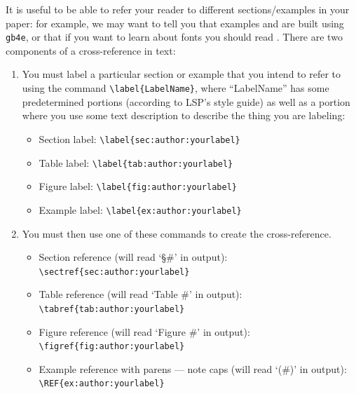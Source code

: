\documentclass[output=paper,colorlinks,citecolor=brown,
]{langscibook}
\begin{document}
It is useful to be able to refer your reader to different sections/examples in your paper: for example, we may want to tell you that examples  and  are built using \texttt{gb4e}, or that if you want to learn about fonts you should read . There are two components of a cross-reference in text: 

\begin{enumerate}    

\item You must label a particular section or example that you intend to refer to using the command \verb|\label{LabelName}|, where ``LabelName'' has some predetermined portions (according to LSP's style guide) as well as a portion where you use some text description to describe the thing you are labeling: 

\begin{itemize}

\item Section label: \verb|\label{sec:author:yourlabel}|

\item Table label: \verb|\label{tab:author:yourlabel}|

\item Figure label: \verb|\label{fig:author:yourlabel}|

\item Example label: \verb|\label{ex:author:yourlabel}|

\end{itemize}

    
\item You must then use one of these commands to create the cross-reference. 

\begin{itemize}

\item Section reference (will read `\S \#’ in output):\\ \verb|\sectref{sec:author:yourlabel}|

\item Table reference (will read `Table \#’ in output):\\ \verb|\tabref{tab:author:yourlabel}|

\item Figure reference (will read `Figure \#’ in output): \\ \verb|\figref{fig:author:yourlabel}|

\item Example reference with parens — note caps (will read `(\#)’ in output): \\ \verb|\REF{ex:author:yourlabel}| 


\end{itemize}
\end{enumerate}
\end{document}
